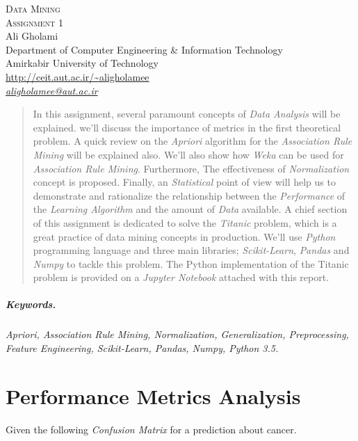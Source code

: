 \documentclass[12pt]{article}
\numberwithin{equation}{section}
\numberwithin{table}{section}
\numberwithin{figure}{section}
\begin{document}

\begin{center}
\textsc{\Large Data Mining} \\[2pt]
	\textsc{\large Assignment 1}\\
	\vspace{0.5cm}
  Ali Gholami \\[6pt]
  Department of Computer Engineering \& Information Technology\\
  Amirkabir University of Technology  \\[6pt]
  \def\UrlFont{\em}
  \url{http://ceit.aut.ac.ir/~aligholamee}\\
    \href{mailto:aligholamee@aut.ac.ir}{\textit{aligholamee@aut.ac.ir}}
\end{center}

\begin{abstract}
In this assignment, several paramount concepts of \textit{Data Analysis} will be explained. we'll discuss the importance of metrics in the first theoretical problem. A quick review on the \textit{Apriori} algorithm for the \textit{Association Rule Mining} will be explained also. We'll also show how \textit{Weka} can be used for \textit{Association Rule Mining}. Furthermore, The effectiveness of \textit{Normalization} concept is proposed. Finally, an \textit{Statistical} point of view will help us to demonstrate and rationalize the relationship between the \textit{Performance} of the \textit{Learning Algorithm} and the amount of \textit{Data} available. A chief section of this assignment is dedicated to solve the \textit{Titanic} problem, which is a great practice of data mining concepts in production. We'll use \textit{Python} programming language and three main libraries; \textit{Scikit-Learn}, \textit{Pandas} and \textit{Numpy} to tackle this problem. The Python implementation of the Titanic problem is provided on a \textit{Jupyter Notebook} attached with this report.
\end{abstract} 

\subparagraph{Keywords.} \textit{Apriori, Association Rule Mining, Normalization, Generalization, Preprocessing, Feature Engineering, Scikit-Learn, Pandas, Numpy, Python 3.5.}

\section{Performance Metrics Analysis}
Given the following \textit{Confusion Matrix} for a prediction about cancer.
\end{document}
